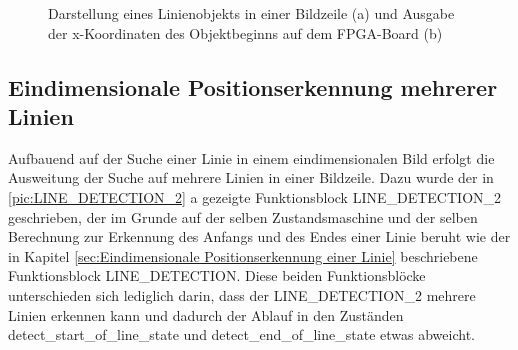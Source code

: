 \documentclass[ngerman,12pt]{article} %
\begin{document}
{\begin{figure}[h!tb]
  \centering
  \qquad
  \caption[Darstellung eines Linienobjekts in einer Bildzeile und die Ausgabe der x-Koordinate auf dem FPGA-Board]{\label{pic:Linienobjekt}Darstellung eines Linienobjekts in einer Bildzeile (a) und Ausgabe der x-Koordinaten des Objektbeginns auf dem FPGA-Board (b)}
\end{figure}



\subsection{Eindimensionale Positionserkennung mehrerer Linien}
\label{sec:Eindimensionale Positionserkennung mehrerer Linien}
Aufbauend auf der Suche einer Linie in einem eindimensionalen Bild erfolgt die Ausweitung der Suche auf mehrere Linien in einer Bildzeile. Dazu wurde der in \autoref{pic:LINE_DETECTION_2} a gezeigte Funktionsblock LINE\_DETECTION\_2 geschrieben, der im Grunde auf der selben Zustandsmaschine und der selben Berechnung zur Erkennung des Anfangs und des Endes einer Linie beruht wie der in Kapitel \ref{sec:Eindimensionale Positionserkennung einer Linie} beschriebene Funktionsblock LINE\_DETECTION. Diese beiden Funktionsblöcke unterschieden sich lediglich darin, dass der LINE\_DETECTION\_2 mehrere Linien erkennen kann und dadurch der Ablauf in den Zuständen detect\_start\_of\_line\_state und detect\_end\_of\_line\_state etwas abweicht.\newline

}
\end{document}
